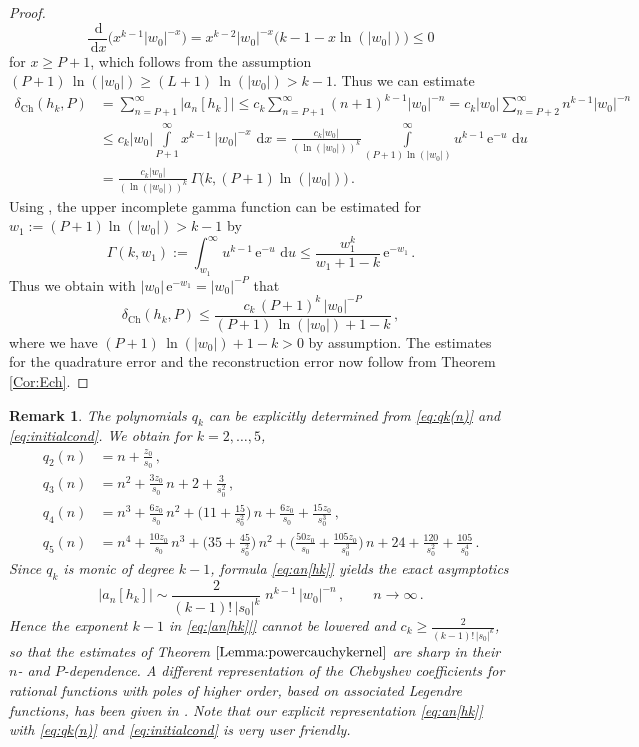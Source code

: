 \documentclass[11pt,a4paper]{scrartcl}
\renewcommand{\d}{\,\mathrm{d}}
\newtheorem{remark}[theorem]{Remark}
\numberwithin{equation}{section}
\numberwithin{table}{section}
\numberwithin{figure}{section}
\newcommand{\e}{\mathrm e}
\begin{document}
\begin{proof}
$$ \textstyle \frac{\d}{\d x}\big(x^{k-1}|w_0|^{-x}\big) = x^{k-2}|w_0|^{-x}\big(k-1-x\ln (|w_0|)\big) \le 0$$
 for $x \ge P+1$, which follows from the assumption $(P+1)\,\ln (|w_0|) \geq (L+1)\,\ln (|w_0|) > k-1$. Thus we can estimate
\begin{align*}
\textstyle \delta_{\mathrm{Ch}}(h_k,P)&=  \textstyle \sum\limits_{n=P+1}^{\infty} |a_n[h_k]| \le
c_k \sum\limits_{n=P+1}^{\infty} (n+1)^{k-1} |w_0|^{-n}  = c_k |w_0| \sum\limits_{n=P+2}^{\infty} n^{k-1} |w_0|^{-n}\\
&\le \textstyle c_k |w_0| \int\limits_{P+1}^{\infty} x^{k-1} \,|w_0|^{-x} \, \d x =
\frac{c_k |w_0|}{(\ln (|w_0|))^k} \int\limits_{(P+1) \ln (|w_0|)}^{\infty} u^{k-1} \, \e^{-u} \, \d u\\
&= \textstyle  \frac{c_k |w_0|}{(\ln (|w_0|))^k}\,\Gamma\big(k,(P+1) \ln (|w_0|)\big)\,.
\end{align*}
Using \cite[Proposition 2.7]{Pi20}, the upper incomplete gamma function can be estimated for
$w_1 := (P+1)\ln (|w_0|) > k-1$ by
$$
\textstyle \Gamma(k,w_1) := \int_{w_1}^{\infty} u^{k-1}\,\e^{-u}\,\d u \leq \frac{w_1^k}{w_1 + 1 - k}\,\e^{-w_1}\,.
$$
Thus we obtain with $|w_0|\,\e^{-w_1} = |w_0|^{-P}$ that
$$
\textstyle \delta_{\mathrm{Ch}}(h_k,P) \leq \frac{c_k\,(P+1)^k\,|w_0|^{-P}}{(P+1)\,\ln (|w_0|) + 1 -k}\,,
$$
where we have $(P+1)\,\ln (|w_0|) + 1 -k > 0$ by assumption.
The estimates for the quadrature error and the reconstruction error now follow from Theorem \ref{Cor:Ech}.
\end{proof}

\begin{remark}
The polynomials $q_k$ can be explicitly determined from \eqref{eq:qk(n)} and \eqref{eq:initialcond}.
We obtain for $k=2,\ldots, 5$,
\begin{align*}
q_2(n) &= n + \tfrac{z_0}{s_0}\,,\\
q_3(n) &= n^2 + \tfrac{3 z_0}{s_0}\,n + 2 + \tfrac{3}{s_0^2}\,,\\
q_4(n) &= n^3 + \tfrac{6 z_0}{s_0}\,n^2 + \big(11 + \tfrac{15}{s_0^2}\big)\,n + \tfrac{6z_0}{s_0} + \tfrac{15 z_0}{s_0^3}\,,\\
q_5(n) &= n^4 + \tfrac{10 z_0}{s_0}\,n^3 + \big(35 + \tfrac{45}{s_0^2}\big)\,n^2 +\big(\tfrac{50 z_0}{s_0} + \tfrac{105 z_0}{s_0^3}\big)\,n + 24 + \tfrac{120}{s_0^2} + \tfrac{105}{s_0^4}\,.
\end{align*}
Since $q_k$ is monic of degree $k-1$, formula \eqref{eq:an[hk]} yields the exact asymptotics
$$
\textstyle \big|a_n[h_k]\big| \sim \frac{2}{(k-1)!\,|s_0|^{k}}\;n^{k-1}\,|w_0|^{-n}\,,
\qquad n \to \infty\,.
$$
Hence the exponent $k-1$ in \eqref{eq:|an[hk]|} cannot be lowered and
$c_k \ge \frac{2}{(k-1)!\,|s_0|^k}$, so that the estimates of Theorem
$\ref{Lemma:powercauchykernel}$ are sharp in their $n$- and $P$-dependence.
A different representation of the Chebyshev coefficients for rational functions with poles of
higher order, based on associated Legendre functions, has been given in \textnormal{\cite[Section~4]{El64}}. Note that our explicit representation \eqref{eq:an[hk]} with \eqref{eq:qk(n)} and
\eqref{eq:initialcond} is very user friendly.
\end{remark}
\end{document}
